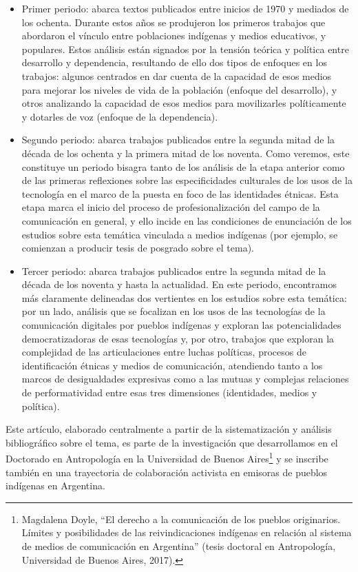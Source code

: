 \documentclass{tufte-handout}
\begin{document}
\begin{itemize}
\item
  Primer periodo: abarca textos publicados entre inicios de 1970 y
  mediados de los ochenta. Durante estos años se produjeron los primeros
  trabajos que abordaron el vínculo entre poblaciones indígenas y medios
  educativos, y populares. Estos análisis están signados por la tensión
  teórica y política entre desarrollo y dependencia, resultando de ello
  dos tipos de enfoques en los trabajos: algunos centrados en dar cuenta
  de la capacidad de esos medios para mejorar los niveles de vida de la
  población (enfoque del desarrollo), y otros analizando la capacidad de
  esos medios para movilizarles políticamente y dotarles de voz (enfoque
  de la dependencia).
\item
  Segundo periodo: abarca trabajos publicados entre la segunda mitad de
  la década de los ochenta y la primera mitad de los noventa. Como
  veremos, este constituye un periodo bisagra tanto de los análisis de
  la etapa anterior como de las primeras reflexiones sobre las
  especificidades culturales de los usos de la tecnología en el marco de
  la puesta en foco de las identidades étnicas. Esta etapa marca el
  inicio del proceso de profesionalización del campo de la comunicación
  en general, y ello incide en las condiciones de enunciación de los
  estudios sobre esta temática vinculada a medios indígenas (por
  ejemplo, se comienzan a producir tesis de posgrado sobre el tema).
\item
  Tercer periodo: abarca trabajos publicados entre la segunda mitad de
  la década de los noventa y hasta la actualidad. En este periodo,
  encontramos más claramente delineadas dos vertientes en los estudios
  sobre esta temática: por un lado, análisis que se focalizan en los
  usos de las tecnologías de la comunicación digitales por pueblos
  indígenas y exploran las potencialidades democratizadoras de esas
  tecnologías y, por otro, trabajos que exploran la complejidad de las
  articulaciones entre luchas políticas, procesos de identificación
  étnicas y medios de comunicación, atendiendo tanto a los marcos de
  desigualdades expresivas como a las mutuas y complejas relaciones de
  performatividad entre esas tres dimensiones (identidades, medios y
  política).
\end{itemize}

Este artículo, elaborado centralmente a partir de la sistematización y
análisis bibliográfico sobre el tema, es parte de la investigación que
desarrollamos en el Doctorado en Antropología en la Universidad de
Buenos Aires\footnote{Magdalena Doyle, ``El derecho a la comunicación de
  los pueblos originarios. Límites y posibilidades de las
  reivindicaciones indígenas en relación al sistema de medios de
  comunicación en Argentina'' (tesis doctoral en Antropología,
  Universidad de Buenos Aires, 2017).} y se inscribe también en una
trayectoria de colaboración activista en emisoras de pueblos indígenas
en Argentina.
\end{document}
